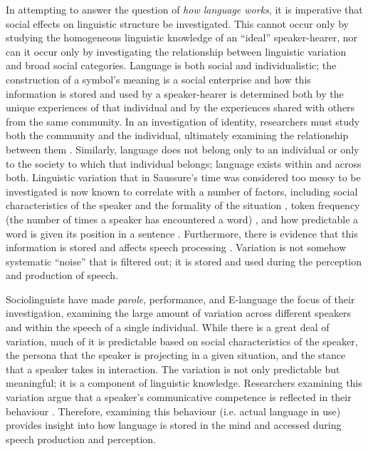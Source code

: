 In attempting to answer the question of \textit{how language works}, it is imperative that social effects on linguistic structure be investigated.  This cannot occur only by studying the homogeneous linguistic knowledge of an ``ideal'' speaker-hearer, nor can it occur only by investigating the relationship between linguistic variation and broad social categories.  Language is both social and individualistic; the construction of a symbol's meaning is a social enterprise and how this information is stored and used by a speaker-hearer is determined both by the unique experiences of that individual and by the experiences shared with others from the same community.  In an investigation of identity, researchers must study both the community and the individual, ultimately examining the relationship between them \cite[146]{wenger1998}.  Similarly, language does not belong only to an individual or only to the society to which that individual belongs; language exists within and across both.  Linguistic variation that in Saussure's time was considered too messy to be investigated is now known to correlate with a number of factors, including social characteristics of the speaker and the formality of the situation \cite{labov1972sociolingpatterns}, token frequency (the number of times a speaker has encountered a word) \cite{bybee2002-lvc}, and  how predictable a word is given its position in a sentence \cite{jurafskyetal2002}. Furthermore, there is evidence that this information is stored and affects speech processing \cite{strand1999,jurafsky2003}.  Variation is not somehow systematic ``noise'' that is filtered out; it is stored and used during the perception and production of speech.

Sociolinguists have made \textit{parole}, performance, and E-language the focus of their investigation, examining the large amount of variation across different speakers and within the speech of a single individual.  While there is a great deal of variation, much of it is predictable based on social characteristics of the speaker, the persona that the speaker is projecting in a given situation, and the stance that a speaker takes in interaction.  The variation is not only predictable but meaningful; it is a component of linguistic knowledge.  Researchers examining this variation argue that a speaker's communicative competence is reflected in their behaviour \cite{hymes1972}.  Therefore, examining this behaviour (i.e. actual language in use) provides insight into how language is stored in the mind and accessed during speech production and perception.  

